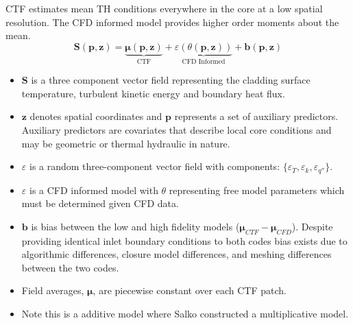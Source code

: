 CTF estimates mean TH conditions everywhere in the core at a low spatial resolution.  The CFD informed model provides higher order moments about the mean.
\begin{equation}
   \mathbf S(\mathbf p, \mathbf z) = \underbrace{ \bm \mu(\mathbf p, \mathbf{z})}_\text{CTF} +
   \underbrace{\varepsilon({\theta (\bm p, \mathbf z)})}_\text{CFD Informed} + \bm b(\mathbf p, \mathbf{z})
   \label{eq:hi2lo_overview}
\end{equation}

\begin{itemize}
        \item $\mathbf S$ is a three component vector field representing the cladding surface temperature, turbulent kinetic energy and boundary heat flux.
        \item $\mathbf z$ denotes spatial coordinates and $\mathbf p$ represents a set of auxiliary predictors.  Auxiliary predictors are covariates that describe local core conditions and may be geometric or thermal hydraulic in nature.
        \item $\varepsilon$ is a random three-component vector field with components: $\{\varepsilon_T, \varepsilon_k, \varepsilon_{q''}\}$.
        \item $\varepsilon$ is a CFD informed model with $\theta$ representing free model parameters which must be determined given CFD data.
        \item $\bm b$ is bias between the low and high fidelity models ($\bm \mu_{CTF} - \bm \mu_{CFD}$).  Despite providing identical inlet boundary conditions to both codes bias exists due to algorithmic differences, closure model differences, and meshing differences between the two codes.
        \item Field averages, $\bm \mu$, are piecewise constant over each CTF patch.
        \item Note this is a additive model where Salko constructed a multiplicative model.
\end{itemize}

